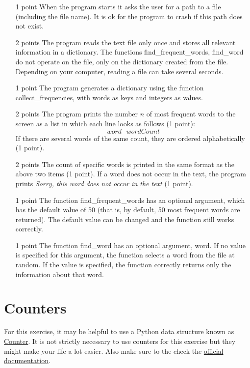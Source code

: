 \documentclass[11pt, a4paper]{article}
\begin{document}
\begin{itemize}
\item[1 point] When the program starts it asks the user for a path to a file (including the file name). It is ok for the program to crash if this path does not exist.
\item[2 points] The program reads the text file only once and stores all relevant information in a dictionary. The functions find\_frequent\_words, find\_word do not operate on the file, only on the dictionary created from the file. Depending on your computer, reading a file can take several seconds.
\item[1 point] The program generates a dictionary using the function collect\_frequencies, with words as keys and integers as values.
\item[2 points] The program prints the number $n$ of most frequent words to the screen as a list in which each line looks as follows (1 point):
$$ word~~~wordCount $$
If there are several words of the same count, they are ordered alphabetically (1 point).
\item[2 points] The count of specific words is printed in the same format as the above two items (1 point). If a word does not occur in the text, the program prints \textit{Sorry, this
word does not occur in the text} (1 point).
\item[1 point] The function find\_frequent\_words has an optional argument, which has the default value of 50 (that is, by default, 50 most frequent words are returned). The default value can be changed and the function still works correctly.
\item[1 point] The function find\_word has an optional argument, word. If no value is specified for this argument, the function selects a word from the file at random. If the value is specified, the function correctly returns only the information about that word.
\end{itemize}


\enlargethispage{1cm}
\section{Counters}
For this exercise, it may be helpful to use a Python data structure known as 
\href{https://pymotw.com/3/collections/counter.html}{Counter}. It is not strictly necessary to use counters for this exercise but they might make your life a lot easier. Also make sure to the check the \href{https://docs.python.org/3/library/collections.html#collections.Counter}{official documentation}.
\end{document}
